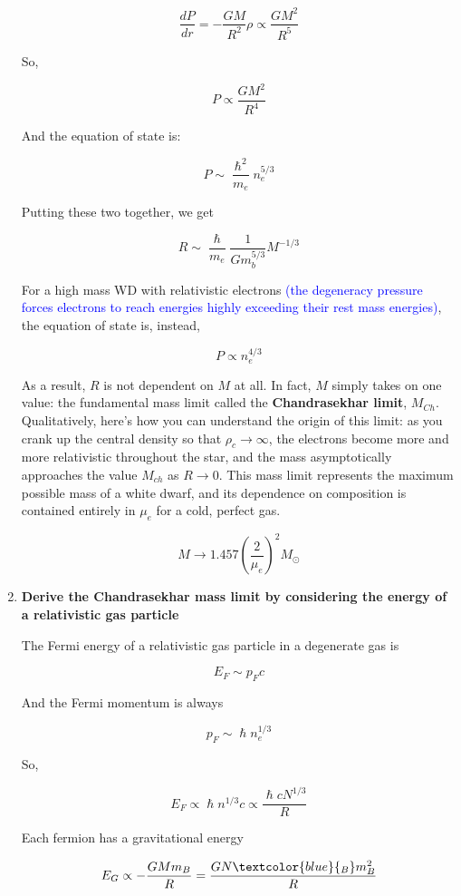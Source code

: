 \documentclass[a4paper]{article}
\begin{document}
\begin{enumerate}
$$ \frac{dP}{dr} = -\frac{GM}{R^2} \rho \propto \frac{G M^2}{R^5} $$

So,

$$ P \propto \frac{G M^2}{R^4} $$

And the equation of state is:

$$ P \sim \frac{\hslash^2}{m_e} n_e^{5/3} $$

Putting these two together, we get

$$ R \sim \frac{\hslash}{m_e} \frac{1}{G m_b^{5/3}} M^{-1/3} $$

For a high mass WD with relativistic electrons \textcolor{blue}{(the degeneracy pressure forces electrons to reach energies highly exceeding their rest mass energies)}, the equation of state is, instead, 

$$ P \propto n_e^{4/3} $$

As a result, $R$ is not dependent on $M$ at all. In fact, $M$ simply takes on one value: the fundamental mass limit called the \textbf{Chandrasekhar limit}, $M_{Ch}$. Qualitatively, here's how you can understand the origin of this limit: as you crank up the central density so that $\rho_c \rightarrow \infty$, the electrons become more and more relativistic throughout the star, and the mass asymptotically approaches the value $M_{ch}$ as $R \rightarrow 0$. This mass limit represents the maximum possible mass of a white dwarf, and its dependence on composition is contained entirely in $\mu_e$ for a cold, perfect gas. 

\begin{equation}
M \rightarrow 1.457 \left( \frac{2}{\mu_e} \right)^2 M_\odot 
\end{equation}

\item \textbf{Derive the Chandrasekhar mass limit by considering the energy of a relativistic gas particle}

The Fermi energy of a relativistic gas particle in a degenerate gas is

$$ E_F \sim p_F c $$

And the Fermi momentum is always

$$ p_F \sim \hslash n_e^{1/3} $$

So, 

$$ E_F \propto \hslash n^{1/3} c \propto \frac{\hslash c N^{1/3}}{R} $$

Each fermion has a gravitational energy

$$ E_G \propto - \frac{G M m_B}{R} = \frac{G N\textcolor{blue}{_B} m_B^2}{R} $$


\end{enumerate}
\end{document}
